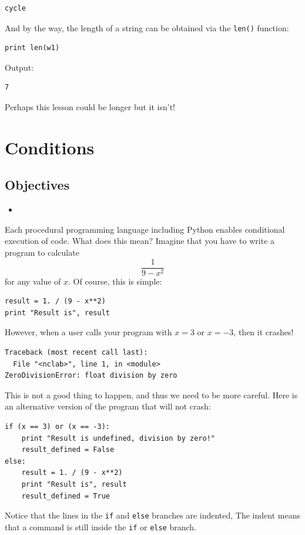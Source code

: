 \documentclass[article,A4,12pt]{llncs}
\begin{document}
\begin{verbatim}
cycle
\end{verbatim}
And by the way, the length of a string can be obtained via the {\tt len()} function:

\begin{verbatim}
print len(w1)
\end{verbatim}
Output:

\begin{verbatim}
7
\end{verbatim}
Perhaps this lesson could be longer but it isn't!

\section{Conditions}

\subsection{Objectives}

\begin{itemize}
\item
\end{itemize}

Each procedural programming language including Python enables conditional 
execution of code. What does this mean? Imagine that you have to write
a program to calculate
$$
\frac{1}{9 - x^2}
$$
for any value of $x$. Of course, this is simple:

\begin{verbatim}
result = 1. / (9 - x**2)
print "Result is", result
\end{verbatim}
However, when a user calls your program with $x = 3$ or $x = -3$, then
it crashes!

\begin{verbatim}
Traceback (most recent call last):
  File "<nclab>", line 1, in <module>
ZeroDivisionError: float division by zero
\end{verbatim}
This is not a good thing to happen, and thus we need to be more careful.
Here is an alternative version of the program that will not crash:

\begin{verbatim}
if (x == 3) or (x == -3):
    print "Result is undefined, division by zero!"
    result_defined = False
else:
    result = 1. / (9 - x**2)
    print "Result is", result
    result_defined = True
\end{verbatim}
Notice that the lines in the {\tt if} and {\tt else} branches are indented,
The indent means that a command is still inside the {\tt if} or {\tt else}
branch.
\end{document}
